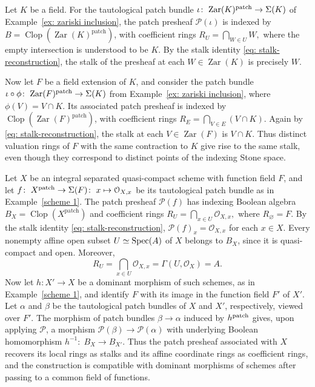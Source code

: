 \documentclass[11pt]{amsart}
\begin{document}
\begin{example}\label{ex: zariski inclusion 2} Let $K$ be a field. For the tautological patch bundle $\iota\colon\; {\rm Zar}(K)^{\mathrm{patch}}\to \Sigma(K)$ of Example~\ref{ex: zariski inclusion}, the patch presheaf $\mathcal P(\iota)$ is indexed by
$B=\operatorname{Clop}(\operatorname{Zar}(K)^{\mathrm{patch}})$, with coefficient rings
$R_U=\bigcap_{W\in U}W,$ where  the empty intersection is understood to be $K$. By the stalk identity \eqref{eq: stalk-reconstruction}, the stalk of the presheaf at each $W\in\operatorname{Zar}(K)$ is precisely $W$.

Now let $F$ be a field extension of $K$, and consider the patch bundle $\iota \circ \phi\colon\; {\rm Zar}(F)^{\rm patch} \rightarrow \Sigma(K)$ from Example~\ref{ex: zariski inclusion}, where $\phi(V)=V\cap K$.
Its associated patch presheaf is indexed by $\operatorname{Clop}(\operatorname{Zar}(F)^{\mathrm{patch}})$, with coefficient rings
$R_E=\bigcap_{V\in E}(V\cap K).$ Again by \eqref{eq: stalk-reconstruction}, the stalk at each $V\in\operatorname{Zar}(F)$ is $V\cap K.$
Thus distinct valuation rings of $F$ with the same contraction to $K$ give rise to the same stalk, even though they correspond to distinct
points of the indexing Stone space.
\end{example}

\begin{example}\label{scheme 2}
Let $X$ be an integral separated quasi-compact scheme with function field $F$, and let $f\colon\;X^{\rm patch}\to \Sigma(F)\colon\; x \mapsto \mathcal O_{X,x}$ be its tautological patch bundle as in Example~\ref{scheme 1}. The patch presheaf $\mathcal P(f)$ has indexing Boolean algebra $ B_X=\operatorname{Clop}(X^{\mathrm{patch}})$  and coefficient rings $R_U=\bigcap_{x\in U}\mathcal O_{X,x},$ where $R_\varnothing=F$. By the stalk identity \eqref{eq: stalk-reconstruction}, $\mathcal P(f)_x=\mathcal O_{X,x}$ for each $x\in X$. Every nonempty affine open subset
$U\simeq\mbox{\rm Spec}(A)$ of $X$ belongs to $B_X$, since it is quasi-compact and open. Moreover,
\[
R_U=\bigcap_{x\in U}\mathcal O_{X,x}
=\Gamma(U,\mathcal O_X)=A.
\]
Now let $h\colon X'\to X$ be a dominant morphism of such schemes, as in Example~\ref{scheme 1}, and identify $F$
with its image in the function field $F'$ of $X'$. Let $\alpha$ and $\beta$ be the tautological patch bundles of $X$ and $X'$,
respectively, viewed over $F'$. The morphism of patch bundles $\beta\to\alpha$ induced by $h^{\rm patch}$ gives, upon applying $\mathcal P$, a
morphism $\mathcal P(\beta)\to\mathcal P(\alpha)$ with underlying Boolean homomorphism $h^{-1}\colon\; B_X\to B_{X'}$. Thus the patch presheaf associated with $X$ recovers its local rings as stalks and its affine coordinate rings as coefficient rings, and the construction is compatible with dominant morphisms of schemes after passing to a common field of functions.
\end{example}
\end{document}

